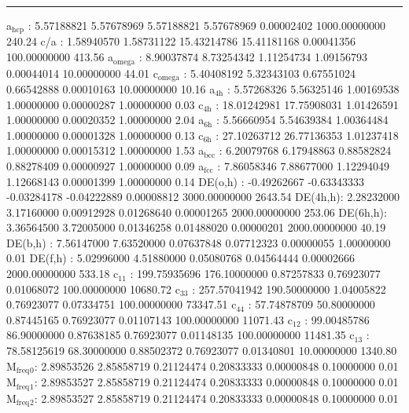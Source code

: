 \documentclass[11pt]{article}
\begin{document}
\noindent\rule{\textwidth}{0.5pt}
a\(_{\text{hcp}}\)   :   5.57188821   5.57678969   5.57188821   5.57678969   0.00002402 1000.00000000       240.24
c/a     :   1.58940570   1.58731122  15.43214786  15.41181168   0.00041356 100.00000000       413.56
a\(_{\text{omega}}\) :   8.90037874   8.73254342   1.11254734   1.09156793   0.00044014  10.00000000        44.01
c\(_{\text{omega}}\) :   5.40408192   5.32343103   0.67551024   0.66542888   0.00010163  10.00000000        10.16
a\(_{\text{4h}}\)    :   5.57268326   5.56325146   1.00169538   1.00000000   0.00000287   1.00000000         0.03
c\(_{\text{4h}}\)    :  18.01242981  17.75908031   1.01426591   1.00000000   0.00020352   1.00000000         2.04
a\(_{\text{6h}}\)    :   5.56660954   5.54639384   1.00364484   1.00000000   0.00001328   1.00000000         0.13
c\(_{\text{6h}}\)    :  27.10263712  26.77136353   1.01237418   1.00000000   0.00015312   1.00000000         1.53
a\(_{\text{bcc}}\)   :   6.20079768   6.17948863   0.88582824   0.88278409   0.00000927   1.00000000         0.09
a\(_{\text{fcc}}\)   :   7.86058346   7.88677000   1.12294049   1.12668143   0.00001399   1.00000000         0.14
DE(o,h) :  -0.49262667  -0.63343333  -0.03284178  -0.04222889   0.00008812 3000.00000000      2643.54
DE(4h,h):   2.28232000   3.17160000   0.00912928   0.01268640   0.00001265 2000.00000000       253.06
DE(6h,h):   3.36564500   3.72005000   0.01346258   0.01488020   0.00000201 2000.00000000        40.19
DE(b,h) :   7.56147000   7.63520000   0.07637848   0.07712323   0.00000055   1.00000000         0.01
DE(f,h) :   5.02996000   4.51880000   0.05080768   0.04564444   0.00002666 2000.00000000       533.18
c\(_{\text{11}}\)    : 199.75935696 176.10000000   0.87257833   0.76923077   0.01068072 100.00000000     10680.72
c\(_{\text{33}}\)    : 257.57041942 190.50000000   1.04005822   0.76923077   0.07334751 100.00000000     73347.51
c\(_{\text{44}}\)    :  57.74878709  50.80000000   0.87445165   0.76923077   0.01107143 100.00000000     11071.43
c\(_{\text{12}}\)    :  99.00485786  86.90000000   0.87638185   0.76923077   0.01148135 100.00000000     11481.35
c\(_{\text{13}}\)    :  78.58125619  68.30000000   0.88502372   0.76923077   0.01340801  10.00000000      1340.80
M\(_{\text{freq}}\)\(_{\text{0}}\):   2.89853526   2.85858719   0.21124474   0.20833333   0.00000848   0.10000000         0.01
M\(_{\text{freq}}\)\(_{\text{1}}\):   2.89853527   2.85858719   0.21124474   0.20833333   0.00000848   0.10000000         0.01
M\(_{\text{freq}}\)\(_{\text{2}}\):   2.89853527   2.85858719   0.21124474   0.20833333   0.00000848   0.10000000         0.01
\end{document}
